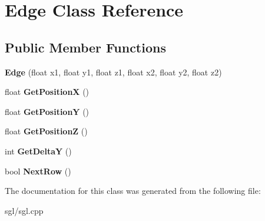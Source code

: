 \hypertarget{class_edge}{}\section{Edge Class Reference}
\label{class_edge}
\subsection*{Public Member Functions}
\begin{DoxyCompactItemize}
\item 
\mbox{\label{class_edge_a6ea465e0bd07ab5428ce26225bcb811e}} 
{\bfseries Edge} (float x1, float y1, float z1, float x2, float y2, float z2)
\item 
\mbox{\label{class_edge_aa1c8cdcbd41e3b3b421df172e2aea77b}} 
float {\bfseries Get\+PositionX} ()
\item 
\mbox{\label{class_edge_ae124ff527b00c86a16e49d992ce4fa0d}} 
float {\bfseries Get\+PositionY} ()
\item 
\mbox{\label{class_edge_aeca4a489a032172e250a714b8c291c9e}} 
float {\bfseries Get\+PositionZ} ()
\item 
\mbox{\label{class_edge_aa8a5ad1d4b8575fdff96147e6f44c355}} 
int {\bfseries Get\+DeltaY} ()
\item 
\mbox{\label{class_edge_a1d52557b1b2ad4f45aa87965de567794}} 
bool {\bfseries Next\+Row} ()
\end{DoxyCompactItemize}


The documentation for this class was generated from the following file\+:\begin{DoxyCompactItemize}
\item 
sgl/sgl.\+cpp\end{DoxyCompactItemize}
